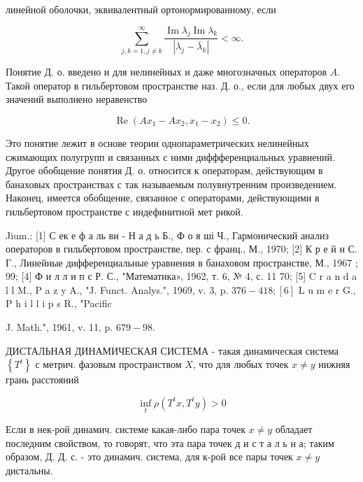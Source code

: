 \documentclass[10pt]{article}
\begin{document}
линейной оболочки, эквивалентный ортонормированному, если



\[

\sum_{j, k=1, j \neq k}^{\infty} \frac{\operatorname{Im} \lambda_{j} \operatorname{Im} \lambda_{k}}{\left|\lambda_{j}-\bar{\lambda}_{k}\right|}<\infty .

\]



Понятие Д. о. введено и для нелинейных и даже многозначных операторов $A$. Такой оператор в гильбертовом пространстве наз. Д. о., если для любых двух его значений выполнено неравенство



\[

\operatorname{Re}\left(A x_{1}-A x_{2}, x_{1}-x_{2}\right) \leqslant 0 .

\]



Это понятие лежит в основе теории однопараметрических нелинейных сжимающих полугрупп и связанных с ними диффференциальных уравнений. Другое обобщение понятия Д. о. относится к операторам, действующим в банаховых пространствах с так называемым полувнутренним произведением. Наконец, имеется обобщение, связанное с операторами, действующими в гильбертовом пространстве с индефинитной мет рикой.



Jium.: [1] С ек е ф а ль ви - Н а д ь Б., Ф о я ші Ч., Гармонический анализ операторов в гильбертовом пространстве, пер. с франц., М., 1970; [2] К р е й н С. Г., Линейные дифференциальные уравнения в банаховом пространстве, М., 1967 ; 99; [4] Ф и л л и п с Р. С., "Математика», 1962, т. 6, № 4, с. 11 70; [5] C r a n d a l l M., P a z y A., "J. Funct. Analys.", 1969, v. 3, p. $376-418 ;[6]$ L u m e r G., P h i l l i p s R., "Pacific

J. Math.", 1961, v. 11, p. $679-98$.



ДИСТАЛЬНАЯ ДИНАМИЧЕСКАЯ СИСТЕМА - такая динамическая система $\left\{T^{t}\right\}$ с метрич. фазовым пространством $X$, что для любых точек $x \neq y$ нижняя грань расстояний



\[

\inf _{t} \rho\left(T^{t} x, T^{t} y\right)>0

\]



Если в нек-рой динамич. системе какая-либо пара точек $x \neq y$ обладает последним свойством, то говорят, что эта пара точек д и с т а л ь н а; таким образом, Д. Д. с. - это динамич. система, для к-рой все пары точек $x \neq y$ дистальны.
\end{document}
